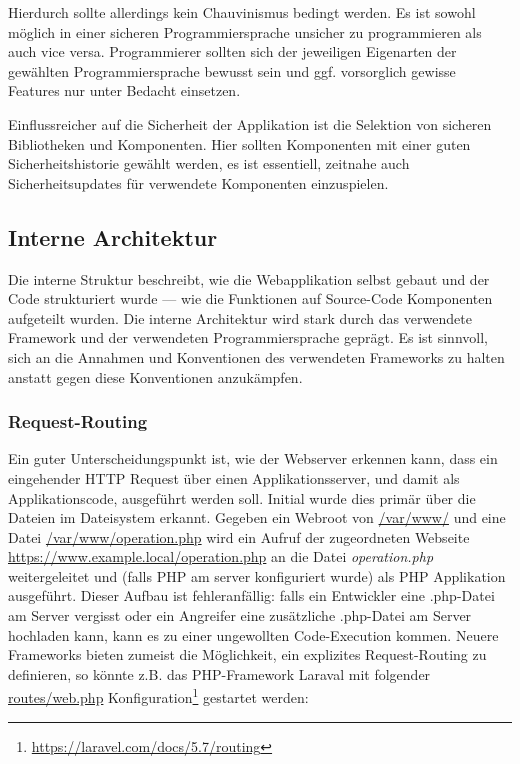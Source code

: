Hierdurch sollte allerdings kein Chauvinismus bedingt werden. Es ist sowohl möglich in einer sicheren Programmiersprache unsicher zu programmieren als auch vice versa. Programmierer sollten sich der jeweiligen Eigenarten der gewählten Programmiersprache bewusst sein und ggf. vorsorglich gewisse Features nur unter Bedacht einsetzen.

Einflussreicher auf die Sicherheit der Applikation ist die Selektion von sicheren Bibliotheken und Komponenten. Hier sollten Komponenten mit einer guten Sicherheitshistorie gewählt werden, es ist essentiell, zeitnahe auch Sicherheitsupdates für verwendete Komponenten einzuspielen.

\subsection{Interne Architektur}

Die interne Struktur beschreibt, wie die Webapplikation selbst gebaut und der Code strukturiert wurde --- wie die Funktionen auf Source-Code Komponenten aufgeteilt wurden. Die interne Architektur wird stark durch das verwendete Framework und der verwendeten Programmiersprache geprägt. Es ist sinnvoll, sich an die Annahmen und Konventionen des verwendeten Frameworks zu halten anstatt gegen diese Konventionen anzukämpfen.

\subsubsection{Request-Routing}

Ein guter Unterscheidungspunkt ist, wie der Webserver erkennen kann, dass ein eingehender HTTP Request über einen Applikationsserver, und damit als Applikationscode, ausgeführt werden soll. Initial wurde dies primär über die Dateien im Dateisystem erkannt. Gegeben ein Webroot von \url{/var/www/} und eine Datei \url{/var/www/operation.php} wird ein Aufruf der zugeordneten Webseite \url{https://www.example.local/operation.php} an die Datei \textit{operation.php} weitergeleitet und (falls PHP am server konfiguriert wurde) als PHP Applikation ausgeführt. Dieser Aufbau ist fehleranfällig: falls ein Entwickler eine .php-Datei am Server vergisst oder ein Angreifer eine zusätzliche .php-Datei am Server hochladen kann, kann es zu einer ungewollten Code-Execution kommen. Neuere Frameworks bieten zumeist die Möglichkeit, ein explizites Request-Routing zu definieren, so könnte z.B. das PHP-Framework Laraval mit folgender \url{routes/web.php} Konfiguration\footnote{\url{https://laravel.com/docs/5.7/routing}} gestartet werden:

